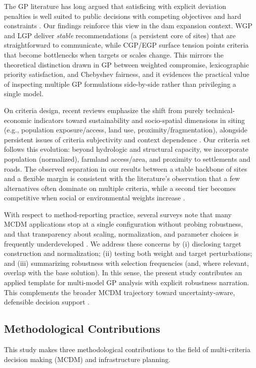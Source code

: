 The GP literature has long argued that satisficing with explicit deviation penalties is well suited to public decisions with competing objectives and hard constraints \cite{jones2010}. Our findings reinforce this view in the dam expansion context. WGP and LGP deliver \textit{stable} recommendations (a persistent core of sites) that are straightforward to communicate, while CGP/EGP surface tension points criteria that become bottlenecks when targets or scales change. This mirrors the theoretical distinction drawn in GP between weighted compromise, lexicographic priority satisfaction, and Chebyshev fairness, and it evidences the practical value of inspecting multiple GP formulations side-by-side rather than privileging a single model.

On criteria design, recent reviews emphasize the shift from purely technical-economic indicators toward sustainability and socio-spatial dimensions in siting (e.g., population exposure/access, land use, proximity/fragmentation), alongside persistent issues of criteria subjectivity and context dependence \cite{KUMAR2017596,Aruldoss2013}. Our criteria set follows this evolution: beyond hydrologic and structural capacity, we incorporate population (normalized), farmland access/area, and proximity to settlements and roads. The observed separation in our results between a stable backbone of sites and a flexible margin is consistent with the literature's observation that a few alternatives often dominate on multiple criteria, while a second tier becomes competitive when social or environmental weights increase \cite{Aruldoss2013}.

With respect to method-reporting practice, several surveys note that many MCDM applications stop at a single configuration without probing robustness, and that transparency about scaling, normalization, and parameter choices is frequently underdeveloped \cite{Aruldoss2013}. We address these concerns by (i) disclosing target construction and normalization; (ii) testing both weight and target perturbations; and (iii) summarizing robustness with selection frequencies (and, where relevant, overlap with the base solution). In this sense, the present study contributes an applied template for multi-model GP analysis with explicit robustness narration. This complements the broader MCDM trajectory toward uncertainty-aware, defensible decision support \cite{jones2010,Mardani2015}.

\subsection{Methodological Contributions}
This study makes three methodological contributions to the field of multi-criteria decision making (MCDM) and infrastructure planning. 

